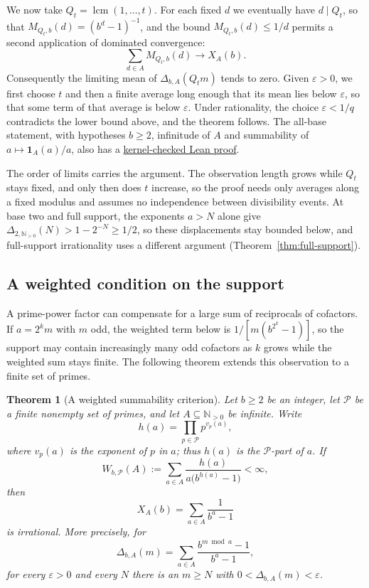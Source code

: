 \documentclass[11pt]{article}
\theoremstyle{plain}
\newtheorem{thm}{Theorem}[section]
\theoremstyle{definition}
\theoremstyle{remark}
\begin{document}
We now take $Q_t=\operatorname{lcm}(1,\ldots,t)$. For each fixed $d$ we
eventually have $d\mid Q_t$, so that $M_{Q_t,b}(d)=(b^d-1)^{-1}$, and the
bound $M_{Q_t,b}(d)\le1/d$ permits a second application of dominated
convergence:
\[
 \sum_{d\in A}M_{Q_t,b}(d)\longrightarrow X_A(b).
\]
Consequently the limiting mean of $\Delta_{b,A}(Q_tm)$ tends to zero.
Given $\varepsilon>0$, we first choose $t$ and then a finite average
long enough that its mean lies below $\varepsilon$, so that some term of
that average is below $\varepsilon$. Under rationality, the choice
$\varepsilon<1/q$ contradicts the lower bound above, and the theorem
follows. The all-base statement, with hypotheses $b\ge2$, infinitude of
$A$ and summability of $a\mapsto\mathbf1_A(a)/a$, also has a
\href{https://github.com/wcook04/plectis-erdos/blob/c91562bd574a387cde904481e609c7b4cacebb14/lean/Erdos249257/AllBaseReciprocalSupportIrrationality.lean#L395}{kernel-checked Lean proof}.

The order of limits carries the argument. The observation length grows
while $Q_t$ stays fixed, and only then does $t$ increase, so the proof needs
only averages along a fixed modulus and assumes no independence between
divisibility events. At base two and full support, the exponents $a>N$
alone give $\Delta_{2,\mathbb N_{>0}}(N)>1-2^{-N}\ge1/2$, so these
displacements stay bounded below, and full-support irrationality uses a
different argument (Theorem~\ref{thm:full-support}).

\subsection{A weighted condition on the support}
A prime-power factor can compensate for a large sum of reciprocals of
cofactors. If $a=2^km$ with $m$ odd, the weighted term below is
$1/[m(b^{2^k}-1)]$, so the support may contain increasingly many odd
cofactors as $k$ grows while the weighted sum stays finite. The following
theorem extends this observation to a finite set of primes.


\begin{thm}[A weighted summability criterion]
\label{thm:257-weighted}
Let $b\ge2$ be an integer, let $\mathcal P$ be a finite nonempty set of
primes, and let $A\subseteq\mathbb N_{>0}$ be infinite.  Write
\[
 h(a)=\prod_{p\in\mathcal P}p^{v_p(a)},
\]
where $v_p(a)$ is the exponent of $p$ in $a$; thus $h(a)$ is the
$\mathcal P$-part of $a$.  If
\begin{equation}\label{eq:257-weighted-mass}
 W_{b,\mathcal P}(A):=
 \sum_{a\in A}\frac{h(a)}{a\bigl(b^{h(a)}-1\bigr)}<\infty,
\end{equation}
then
\[
 X_A(b)=\sum_{a\in A}\frac1{b^a-1}
\]
is irrational.  More precisely, for
\[
 \Delta_{b,A}(m)=
 \sum_{a\in A}\frac{b^{m\bmod a}-1}{b^a-1},
\]
for every $\varepsilon>0$ and every $N$ there is an $m\ge N$ with
$0<\Delta_{b,A}(m)<\varepsilon$.
\end{thm}
\end{document}
